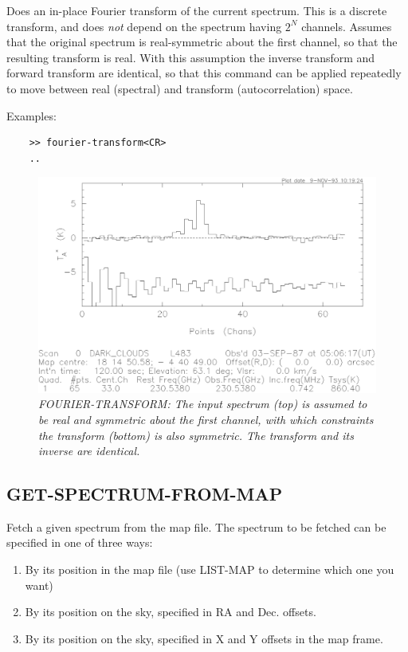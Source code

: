 \documentclass[11pt,twoside]{report}
\begin{document}
Does an in-place Fourier transform of the current spectrum. This is a
discrete transform, and does {\em not} depend on the spectrum having
$2^N$ channels. Assumes that the original spectrum is real-symmetric about
the first channel, so that the resulting transform is real. With this
assumption the inverse transform and forward transform are identical, so
that this command can be applied repeatedly to move between real (spectral)
and transform (autocorrelation) space.

Examples:
\begin{verbatim}
    >> fourier-transform<CR>
    ..
\end{verbatim}

\begin{figure}[htbp]
\begin{center}
\includegraphics[scale=0.65]{fourier.ps}
\protect\parbox{5.5in}
{\caption[FOURIER]
{\sl
FOURIER-TRANSFORM: The input spectrum (top) is assumed to be real and
symmetric about the first channel, with which constraints the transform
(bottom) is also symmetric. The transform and its inverse are identical.
\label{FOURIER}
}
}
\end{center}
\end{figure}

\subsection{GET-SPECTRUM-FROM-MAP} 

Fetch a given spectrum from the map file. The spectrum to be fetched can
be specified in one of three ways:
\begin{enumerate}
\item By its position in the map file (use LIST-MAP to determine which one
      you want)
\item By its position on the sky, specified in RA and Dec. offsets.
\item By its position on the sky, specified in X and Y offsets in the
      map frame.
\end{enumerate}
\end{document}

